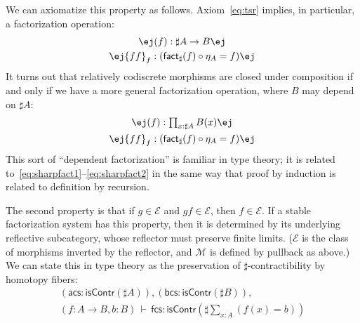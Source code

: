 \documentclass[copyright,12pt]{eptcs}
\makeatletter
\newcommand{\E}{\ensuremath{\mathcal{E}}\xspace}
\newcommand{\M}{\ensuremath{\mathcal{M}}\xspace}
\newcommand{\factsharp}{\textsf{fact}_{\sharp}}
\def\jd#1{\@jd#1\ej}
\def\@jd#1|-#2\ej{\@@jd#1,,\;\vdash\;\left(#2\right)}
\def\@@jd#1,{\@ifmtarg{#1}{\let\next=\relax}{\left(#1\right)\let\next=\@@@jd}\next}
\def\@@@jd#1,{\@ifmtarg{#1}{\let\next=\relax}{,\,\left(#1\right)\let\next=\@@@jd}\next}
\makeatother
\begin{document}
We can axiomatize this property as follows.
Axiom~\eqref{eq:tsr} implies, in particular, a factorization operation:
\begin{gather}
  \jd{\mathsf{bc}:\mathsf{isCodisc}(B), f:A\to B |- \factsharp(f):\sharp A \to B} \label{eq:sharpfact1} \\
  \jd{\mathsf{bc}:\mathsf{isCodisc}(B), f:A\to B |- \mathsf{ff}_f:(\factsharp(f) \circ \eta_A = f)}\label{eq:sharpfact2}
\end{gather}
It turns out that relatively codiscrete morphisms are closed under composition if and only if we have a more general factorization operation, where $B$ may depend on $\sharp A$:
\begin{gather}
  \jd{ \mathsf{bc}:\textstyle\prod_{x:\sharp A}\mathsf{isCodisc}(B(x)),
    f:\textstyle\prod_{x:A} B(\eta_A(x))
    |- \factsharp(f):\textstyle\prod_{x:\sharp A} B(x)} \\
  \jd{ \mathsf{bc}:\textstyle\prod_{x:\sharp A}\mathsf{isCodisc}(B(x)),
    f:\textstyle\prod_{x:A} B(\eta_A(x))
    |- \mathsf{ff}_f: (\factsharp(f) \circ \eta_A = f)}
\end{gather}
This sort of ``dependent factorization'' is familiar in type theory;
it is related to~\eqref{eq:sharpfact1}--\eqref{eq:sharpfact2} in the same way that proof by induction is related to definition by recursion.


The second property is that if $g\in\E$ and $g f \in\E$, then $f\in \E$.
If a stable factorization system has this property, then it is determined by its underlying reflective subcategory, whose reflector must preserve finite limits.
(\E is the class of morphisms inverted by the reflector, and \M is defined by pullback as above.)
We can state this in type theory as the preservation of $\sharp$-contractibility by homotopy fibers:
\begin{multline}\label{eq:lexrefl}
  (\mathsf{acs}:\mathsf{isContr}(\sharp A)), (\mathsf{bcs}:\mathsf{isContr}(\sharp B)), \\
    (f:A\to B, b:B) \,\vdash\, \mathsf{fcs} : \mathsf{isContr}\left(\sharp \textstyle\sum_{x:A}(f(x)=b)\right)
\end{multline}
\end{document}
